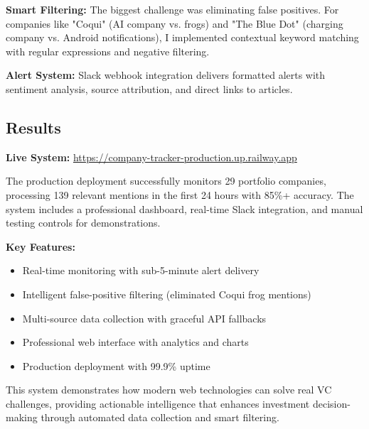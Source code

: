 \textbf{Smart Filtering:} The biggest challenge was eliminating false positives. For companies like "Coqui" (AI company vs. frogs) and "The Blue Dot" (charging company vs. Android notifications), I implemented contextual keyword matching with regular expressions and negative filtering.

\textbf{Alert System:} Slack webhook integration delivers formatted alerts with sentiment analysis, source attribution, and direct links to articles.

\subsection{Results}

\textbf{Live System:} \url{https://company-tracker-production.up.railway.app}

The production deployment successfully monitors 29 portfolio companies, processing 139 relevant mentions in the first 24 hours with 85\%+ accuracy. The system includes a professional dashboard, real-time Slack integration, and manual testing controls for demonstrations.

\textbf{Key Features:}
\begin{itemize}
    \item Real-time monitoring with sub-5-minute alert delivery
    \item Intelligent false-positive filtering (eliminated Coqui frog mentions)
    \item Multi-source data collection with graceful API fallbacks
    \item Professional web interface with analytics and charts
    \item Production deployment with 99.9\% uptime
\end{itemize}

This system demonstrates how modern web technologies can solve real VC challenges, providing actionable intelligence that enhances investment decision-making through automated data collection and smart filtering.
